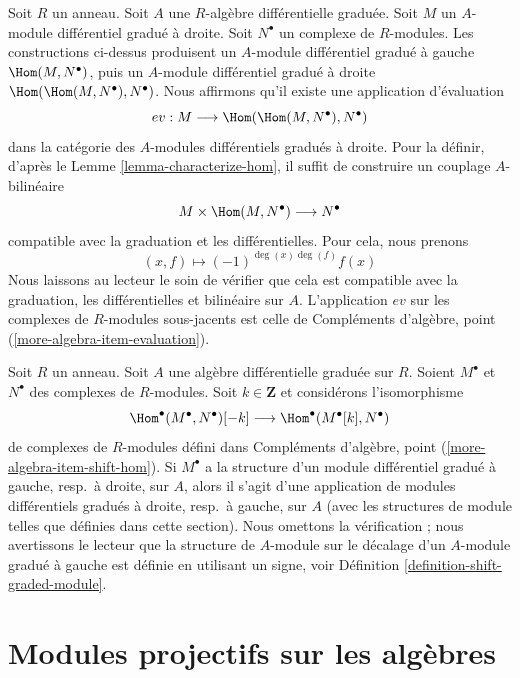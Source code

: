 \begin{remark}
\label{remark-evaluation-map-right}
Soit $R$ un anneau. Soit $A$ une $R$-algèbre différentielle graduée. Soit $M$ un
$A$-module différentiel gradué à droite. Soit $N^\bullet$ un complexe de
$R$-modules. Les constructions ci-dessus produisent un $A$-module différentiel
gradué à gauche $\Hom(M, N^\bullet)$, puis un $A$-module différentiel gradué à
droite $\Hom(\Hom(M, N^\bullet), N^\bullet)$. Nous affirmons qu’il existe une
application d’évaluation
$$
ev : M \longrightarrow \Hom(\Hom(M, N^\bullet), N^\bullet)
$$
dans la catégorie des $A$-modules différentiels gradués à droite. Pour la définir,
d’après le Lemme \ref{lemma-characterize-hom}, il suffit de construire un couplage
$A$-bilinéaire
$$
M \times \Hom(M, N^\bullet) \longrightarrow N^\bullet
$$
compatible avec la graduation et les différentielles. Pour cela, nous prenons
$$
(x, f) \longmapsto (-1)^{\deg(x)\deg(f)}f(x)
$$
Nous laissons au lecteur le soin de vérifier que cela est compatible avec la
graduation, les différentielles et bilinéaire sur $A$. L’application $ev$ sur les
complexes de $R$-modules sous-jacents est celle de Compléments d'algèbre, point
(\ref{more-algebra-item-evaluation}).
\end{remark}

\begin{remark}
\label{remark-shift-dual}
Soit $R$ un anneau. Soit $A$ une algèbre différentielle graduée sur $R$. Soient
$M^\bullet$ et $N^\bullet$ des complexes de $R$-modules. Soit $k \in \mathbf{Z}$
et considérons l'isomorphisme
$$
\Hom^\bullet(M^\bullet, N^\bullet)[-k]
\longrightarrow
\Hom^\bullet(M^\bullet[k], N^\bullet)
$$
de complexes de $R$-modules défini dans Compléments d'algèbre, point
(\ref{more-algebra-item-shift-hom}). Si $M^\bullet$ a la structure d'un module
différentiel gradué à gauche, resp.\ à droite, sur $A$, alors il s'agit d'une
application de modules différentiels gradués à droite, resp.\ à gauche, sur $A$ (avec
les structures de module telles que définies dans cette section). Nous omettons la
vérification ; nous avertissons le lecteur que la structure de $A$-module sur le
décalage d'un $A$-module gradué à gauche est définie en utilisant un signe, voir
Définition \ref{definition-shift-graded-module}.
\end{remark}






\section{Modules projectifs sur les algèbres}
\label{section-projectives-over-algebras}

